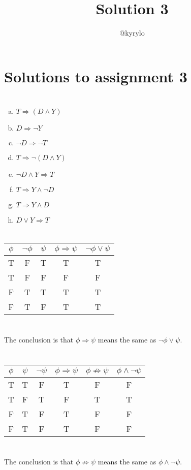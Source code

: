 \documentclass{article}
\title{Solution 3}
\author{@kyrylo}
\begin{document}
\section*{Solutions to assignment 3}

\section{}

\begin{enumerate}[(a)]
\item $T \Rightarrow (D \wedge Y)$
\item $D \Rightarrow \neg Y$
\item $\neg D \Rightarrow \neg T$
\item $T \Rightarrow \neg (D \wedge Y)$
\item $\neg D \wedge Y \Rightarrow T$
\item $T \Rightarrow Y \wedge \neg D$
\item $T \Rightarrow Y \wedge D$
\item $D \vee Y \Rightarrow T$
\end{enumerate}

\section{}

\begin{tabular}{ | c | c | c | c | c | }
  \hline
  $\phi$ & $\neg \phi$ & $\psi$ & $\phi \Rightarrow \psi$ & $\neg \phi \vee \psi$ \\
  \hline
  T & F & T & T & T \\
  T & F & F & F & F \\
  F & T & T & T & T \\
  F & T & F & T & T \\
  \hline
\end{tabular}

\section{}

The conclusion is that $\phi \Rightarrow \psi$ means the same as $\neg \phi \vee \psi$.

\section{}

\begin{tabular}{ | c | c | c | c | c | c | }
  \hline
  $\phi$ & $\psi$ & $\neg \psi$ & $\phi \Rightarrow \psi$ & $\phi \not \Rightarrow \psi$ & $\phi \wedge \neg \psi$ \\
  \hline
  T & T & F & T & F & F \\
  T & F & T & F & T & T \\
  F & T & F & T & F & F \\
  F & T & F & T & F & F \\
  \hline
\end{tabular}

\section{}

The conclusion is that $\phi \not \Rightarrow \psi$  means the same as $\phi \wedge \neg \psi$.
\end{document}
